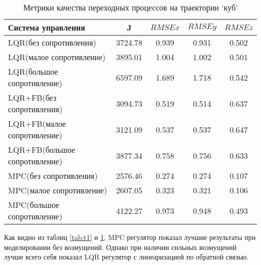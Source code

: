 
\begin{table}[ht]
    \caption{Метрики качества переходных процессов на траектории `куб'}
    \label{tab:t2}
    \centering
    \begin{tabular}{l c c c c}
    \hline
    Система управления & J & \(RMSE x\) & \(RMSE y\) & \(RMSE z\)  \\ \hline
    LQR(без сопротивления) & 3724.78 & 0.939 & 0.931 & 0.502  \\
    LQR(малое сопротивление) & 3895.01 & 1.004 & 1.002 & 0.501\\
    LQR(большое сопротивление) & 6597.09 & 1.689 & 1.718 & 0.542 \\
    LQR+FB(без сопротивления) & 3094.73 & 0.519 & 0.514 & 0.637\\
    LQR+FB(малое сопротивление) & 3121.09 & 0.537 & 0.537 & 0.647\\
    LQR+FB(большое сопротивление) & 3877.34 & 0.758 & 0.756 & 0.633  \\
    MPC(без сопротивления) & 2576.46& 0.274 & 0.274 & 0.107\\
    MPC(малое сопротивление) & 2607.05 & 0.323 & 0.321 & 0.106   \\
    MPC(большое сопротивление) & 4122.27 & 0.973 & 0.948 & 0.493 \\ \hline
    \end{tabular}
\end{table}

Как видно из таблиц \ref{tab:t1} и \ref{tab:t2},
MPC регулятор показал лучшие результаты при моделировании без 
возмущений. Однако при наличии сильных возмущений лучше 
всего себя показал LQR регулятор с линеаризацией по обратной связью.



\endinput